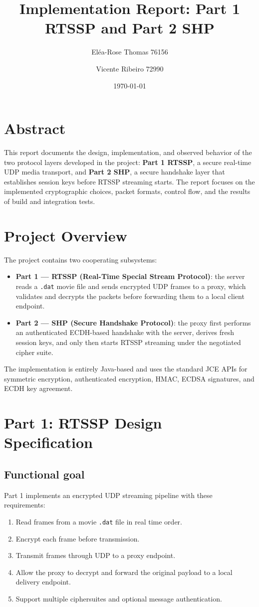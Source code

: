 \documentclass[11pt,a4paper]{article}
\title{Implementation Report: Part 1 RTSSP and Part 2 SHP}
\author{El\'ea-Rose Thomas 76156 \and Vicente Ribeiro 72990}
\date{\today}
\begin{document}
\maketitle

\section*{Abstract}
This report documents the design, implementation, and observed behavior of the two protocol layers developed in the project: \textbf{Part 1 RTSSP}, a secure real-time UDP media transport, and \textbf{Part 2 SHP}, a secure handshake layer that establishes session keys before RTSSP streaming starts. The report focuses on the implemented cryptographic choices, packet formats, control flow, and the results of build and integration tests.

\section{Project Overview}
The project contains two cooperating subsystems:
\begin{itemize}[leftmargin=1.2em]
  \item \textbf{Part 1 --- RTSSP (Real-Time Special Stream Protocol)}: the server reads a \texttt{.dat} movie file and sends encrypted UDP frames to a proxy, which validates and decrypts the packets before forwarding them to a local client endpoint.
  \item \textbf{Part 2 --- SHP (Secure Handshake Protocol)}: the proxy first performs an authenticated ECDH-based handshake with the server, derives fresh session keys, and only then starts RTSSP streaming under the negotiated cipher suite.
\end{itemize}

The implementation is entirely Java-based and uses the standard JCE APIs for symmetric encryption, authenticated encryption, HMAC, ECDSA signatures, and ECDH key agreement.

\section{Part 1: RTSSP Design Specification}
\subsection{Functional goal}
Part 1 implements an encrypted UDP streaming pipeline with these requirements:
\begin{enumerate}[leftmargin=1.2em]
  \item Read frames from a movie \texttt{.dat} file in real time order.
  \item Encrypt each frame before transmission.
  \item Transmit frames through UDP to a proxy endpoint.
  \item Allow the proxy to decrypt and forward the original payload to a local delivery endpoint.
  \item Support multiple ciphersuites and optional message authentication.
\end{enumerate}
\end{document}
